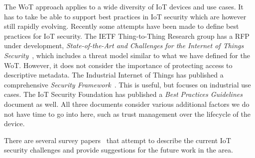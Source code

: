 The WoT approach applies to a wide diversity of IoT devices and use cases.
It has to take be able to support best practices in IoT security which
are however still rapidly evolving.
Recently some attempts have been made to define
best practices for IoT security.
The IETF Thing-to-Thing Research group has a RFP under development,
\emph{State-of-the-Art and Challenges for the Internet of Things 
Security}~\cite{Garcia2017a}, which includes a threat model similar to 
what we have defined for the WoT.  However, it does not consider the 
importance of protecting access to descriptive metadata.
The Industrial Internet of Things has published a comprehensive
\emph{Security Framework}~\cite{Iic2016sf}.
This is useful, but focuses on industrial use cases.
The IoT Security Foundation has published
a \textit{Best Practices Guidelines}~\cite{Iotsf2017a}
document as well.
All three documents consider various additional factors we do
not have time to go into here, such as trust management over the 
lifecycle of the device.

There are several survey papers~\cite{Iot2020,Xu2014,Fernandes2017} that attempt to describe 
the current IoT security challenges and provide suggestions for the future work in the area.




